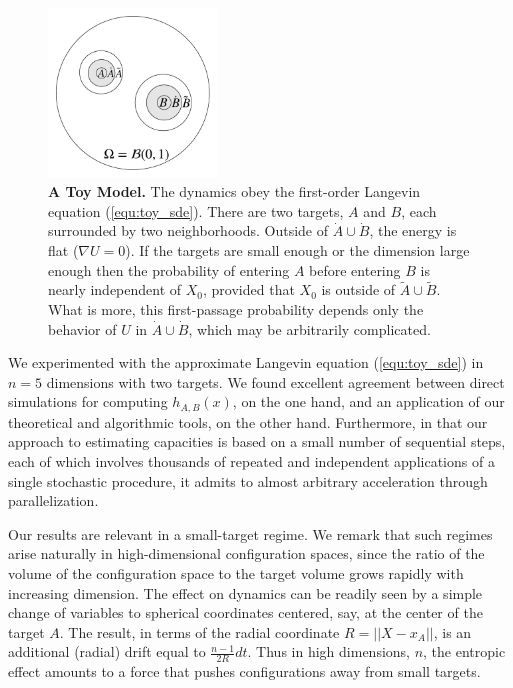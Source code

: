 \documentclass[nofootinbib,english, aip, jcp, priprint, graphicx,floatfix]{revtex4-1}
\theoremstyle{plain}
\theoremstyle{definition}
\theoremstyle{plain}
\newcommand{\dA}{{\dot A}}
\newcommand{\tA}{{\tilde A}}
\newcommand{\dB}{{\dot B}}
\newcommand{\tB}{{\tilde B}}
\begin{document}
\begin{figure}
	\centering	\includegraphics[width=0.4\textwidth]{ToyModel4.png}
	\caption{\footnotesize\linespread{1.}\selectfont{} {\bf A Toy Model.} The dynamics obey the first-order Langevin equation (\ref{equ:toy_sde}). There are two targets, $A$ and $B$, each surrounded by two neighborhoods. Outside of $\dA\cup\dB$, the energy is flat ($\nabla U=0$). If the targets are small enough or the dimension large enough then the probability of entering $A$ before entering $B$  is nearly independent of $X_0$, provided that $X_0$ is outside of $\tA\cup\tB$. What is more, this first-passage probability depends only the behavior of $U$ in $\dA\cup\dB$, which may be arbitrarily complicated.}
\label{fig:ToyModel}
\end{figure}

We experimented with the approximate Langevin equation (\ref{equ:toy_sde}) in $n=5$ dimensions with two targets. 
We found excellent agreement between direct simulations for computing $h_{A,B}(x)$, on the one hand, and an application of our theoretical and algorithmic tools, on the other hand. Furthermore, in that our approach to estimating capacities is based on a small number of sequential steps, each of which involves thousands of repeated and independent applications of a single stochastic procedure, it admits to almost arbitrary acceleration through parallelization.

Our results are relevant in a small-target regime. We remark that such regimes arise naturally in high-dimensional configuration spaces, since the ratio of the volume of the configuration space to the target volume grows rapidly with increasing dimension.
The effect on dynamics can be readily seen by a simple change of variables to spherical coordinates centered, say, at the center of the target $A$. The result, in terms of the radial coordinate $R=||X-x_A||$, is an additional (radial) drift equal to $\frac{n-1}{2R}dt$. Thus in high dimensions, $n$, the entropic effect amounts to a force that pushes configurations away from small targets. 
\end{document}
